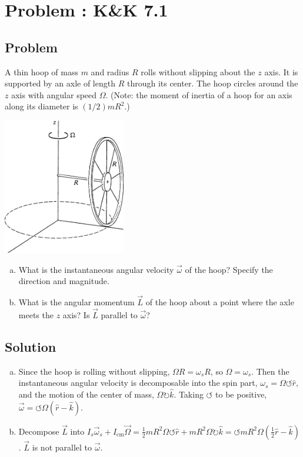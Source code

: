 \documentclass[solutions]{esg8012pset}
\date{\today }
\begin{document}
\section{Problem \thesection: K\&K 7.1}
\subsection{Problem}
  A thin hoop of mass $m$ and radius $R$ rolls without slipping about the $z$ axis. It is supported by an axle of length $R$ through its center. The hoop circles around the $z$ axis with angular speed $\Omega$. (Note: the moment of inertia of a hoop for an axis along its diameter is $(1 / 2)mR^2$.)
  \begin{center}\includegraphics[width=0.4\textwidth]{ps11_1}\end{center}
  \begin{enumerate}[(a)]
    \item What is the instantaneous angular velocity $\vec \omega$ of the hoop? Specify the direction and magnitude.
    \item What is the angular momentum $\vec L$ of the hoop about a point where the axle meets the $z$ axis? Is $\vec L$ parallel to $\vec \omega$?
  \end{enumerate}
\subsection{Solution}
\begin{enumerate}[(a)]
  \item Since the hoop is rolling without slipping, $\Omega R = \omega_s R$, so $\Omega = \omega_s$.  Then the instantaneous angular velocity is decomposable into the spin part, $\omega_s = \Omega \leftturn \hat r$, and the motion of the center of mass, $\Omega \rightturn\hat k$.  Taking $\leftturn$ to be positive, $\vec \omega = \leftturn\Omega(\hat r - \hat k)$.
  \item Decompose $\vec L$ into $I_s \vec \omega_s + I_\text{cm} \vec \Omega = \frac{1}{2} m R^2 \Omega \leftturn \hat r + m R^2 \Omega\rightturn \hat k = \leftturn mR^2 \Omega\left(\frac12 \hat r - \hat k\right)$.  $\vec L$ is not parallel to $\vec \omega$.
\end{enumerate}
\end{document}
